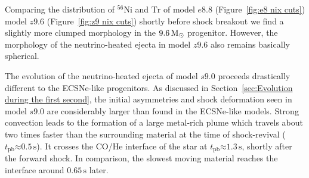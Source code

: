 \documentclass[fleqn,usenatbib]{mnras}
\newcommand{\tpb}{\ensuremath{t_{\text{pb}}}}
\newcommand{\nickel}{\ensuremath{\mathrm{^{56}Ni}}\xspace}
\newcommand{\tracer}{\ensuremath{\mathrm{Tr}}\xspace}
\newcommand{\solm}{\ensuremath{\rm{M_{\odot}}}\xspace}
\newcommand{\s}{\ensuremath{\text{s}}}
\begin{document}
Comparing the distribution of \nickel and \tracer of model $e8.8$ 
(Figure~\ref{fig:e8 nix cuts}) model $z9.6$ (Figure~\ref{fig:z9 nix cuts}) 
shortly before shock breakout we find a slightly more clumped morphology in the 
$9.6\,\solm$ progenitor. However, the morphology of the neutrino-heated ejecta in 
model $z9.6$ also remains basically spherical.

The evolution of the neutrino-heated ejecta of model $s9.0$ proceeds drastically different to the ECSNe-like progenitors. 
As discussed in Section~\ref{sec:Evolution during the first second}, 
the initial asymmetries and shock deformation seen in model $s9.0$ are 
considerably larger than found in the ECSNe-like models. Strong convection leads to the formation of a large metal-rich plume which travels about two times 
faster than the surrounding material at the time of shock-revival ($\tpb\mathord{\approx} 0.5\,\s$).  
It crosses the CO/He interface of the star at $\tpb\mathord{\approx}1.3\,\s$, 
shortly after the forward shock. In comparison, the slowest 
moving material reaches the interface around $ 0.65\,\s$ later. 
\end{document}
